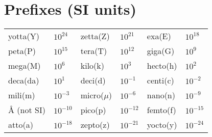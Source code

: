 \section*{Prefixes\normalfont\scriptsize{ (SI units)}}
{\footnotesize
\hspace*{19.75pt}
\begin{tabular}{@{}ll@{\ }ll@{\ }ll@{}}
\toprule
\midrule
yotta(Y)&$10^{24}$&zetta(Z)&$10^{21}$&exa(E)&$10^{18}$\\
peta(P)&$10^{15}$&tera(T)&$10^{12}$&giga(G)&$10^9$\\
mega(M)&$10^6$&kilo(k)&$10^3$&hecto(h)&$10^2$\\
deca(da)&$10^1$&deci(d)&$10^{-1}$&centi(c)&$10^{-2}$\\
mili(m)&$10^{-3}$&micro($\mu$)&$10^{-6}$&nano(n)&$10^{-9}$\\Å (not SI)&$10^{-10}$&pico(p)&$10^{-12}$&femto(f)&$10^{-15}$\\
atto(a)&$10^{-18}$&zepto(z)&$10^{-21}$&yocto(y)&$10^{-24}$\\
\bottomrule
\end{tabular}    
}